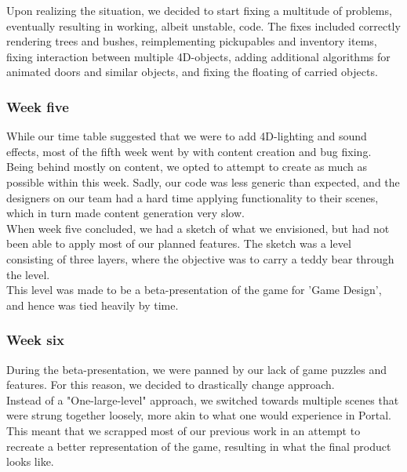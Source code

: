 Upon realizing the situation, we decided to start fixing a multitude of problems, eventually resulting in working, albeit unstable, code. The fixes included correctly rendering trees and bushes, reimplementing pickupables and inventory items, fixing interaction between multiple 4D-objects, adding additional algorithms for animated doors and similar objects, and fixing the floating of carried objects.

\subsubsection{Week five}
While our time table suggested that we were to add 4D-lighting and sound effects, most of the fifth week went by with content creation and bug fixing.\\

Being behind mostly on content, we opted to attempt to create as much as possible within this week. Sadly, our code was less generic than expected, and the designers on our team had a hard time applying functionality to their scenes, which in turn made content generation very slow.\\

When week five concluded, we had a sketch of what we envisioned, but had not been able to apply most of our planned features. The sketch was a level consisting of three layers, where the objective was to carry a teddy bear through the level.\\

This level was made to be a beta-presentation of the game for 'Game Design', and hence was tied heavily by time.\\

\subsubsection{Week six}
During the beta-presentation, we were panned by our lack of game puzzles and features. For this reason, we decided to drastically change approach.\\

Instead of a "One-large-level" approach, we switched towards multiple scenes that were strung together loosely, more akin to what one would experience in Portal.\cite{portalGame} \\

This meant that we scrapped most of our previous work in an attempt to recreate a better representation of the game, resulting in what the final product looks like.